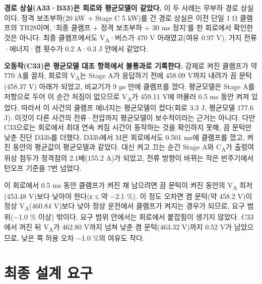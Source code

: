 \textbf{경로 상실(A33·B33)은 회로와 평균모델이 같았다.} 이 두 사례는 무부하 경로 상실이다. 정격 보조부하(20 kW + Stage C 5 kW)를 건 경로 상실은 이전 단일 1 Ω 클램프의 TB28이며, ‘최종 클램프 + 정격 보조부하 + 30 ms 정지’를 한 회로에서 확인한 것은 아니다. 최종 클램프에서도 V\textsubscript{A}·버스가 470 V 아래였고(여유 0.97 V), 가지 전류·에너지·켬 횟수가 0.2 A·0.3 J 안에서 같았다.

\textbf{오동작(C33)은 평균모델 대조 항목에서 불통과로 기록한다.} 강제로 켜진 클램프가 약 770 A를 끌자, 회로의 V\textsubscript{A}는 Stage A가 응답하기 전에 458.09 V까지 내려가 끔 문턱(458.37 V) 아래가 되었고, 비교기가 9 µs 만에 클램프를 껐다. 평균모델은 Stage A를 저항으로 두어 이 순간 처짐이 없으므로 V\textsubscript{A}가 459.11 V에 머물러 0.5 ms 동안 켜져 있었다. 따라서 이 사건의 클램프 에너지는 평균모델이 컸다(회로 3.3 J, 평균모델 177.6 J). 이것이 다른 사건의 전류·전압까지 평균모델이 보수적이라는 근거는 아니다. 다만 C33으로는 회로에서 최대 연속 켜짐 시간이 동작하는 것을 확인하지 못해, 끔 문턱만 낮춘 진단 D33b를 더했다. D33b에서 M은 회로에서도 0.501 ms에 클램프를 껐고, 켜진 동안의 평균값이 평균모델과 같았다. 대신 켜고 끄는 순간 Stage A와 C\textsubscript{A}가 출렁여 위상 첨두가 정격점의 2.1배(155.2 A)가 되었고, 전류 방향이 바뀌는 작은 반주기에서 턴오프 기준을 7번 넘었다.

이 회로에서 0.5 ms 동안 클램프가 켜진 채 남으려면 끔 문턱이 켜진 동안의 V\textsubscript{A} 최저(453.48 V)보다 낮아야 한다(ε ≤ 약 −2.1 \%). 이 정도 오차면 켬 문턱(약 458.2 V)이 정상 V\textsubscript{A}(460.84 V)보다 낮아 정상 운전에서 클램프가 켜지는 경우가 되므로, 요구 범위(−1.0 \% 이상) 밖이다. 요구 범위 안에서는 회로에서 붙잡힘이 생기지 않았다. C33에서 꺼진 뒤 V\textsubscript{A}가 462.80 V까지 넘쳐 낮춘 켬 문턱(463.32 V)까지 0.52 V가 남았으므로, 낮은 쪽 허용 오차 −1.0 \%의 여유도 작다.

\section{최종 설계 요구}

